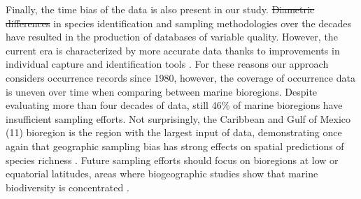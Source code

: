 \documentclass[12pt,authoryear]{elsarticle}
\providecommand{\DIFaddtex}[1]{{\protect\color{blue}\uwave{#1}}} %
\providecommand{\DIFdeltex}[1]{{\protect\color{red}\sout{#1}}}                      %
\providecommand{\DIFaddbegin}{} %
\providecommand{\DIFaddend}{} %
\providecommand{\DIFdelbegin}{} %
\providecommand{\DIFdelend}{} %
\providecommand{\DIFadd}[1]{\texorpdfstring{\DIFaddtex{#1}}{#1}} %
\providecommand{\DIFdel}[1]{\texorpdfstring{\DIFdeltex{#1}}{}} %
\begin{document}

Finally, the time bias of the data is also present in our study. \DIFdelbegin \DIFdel{Diametric differences }\DIFdelend \DIFaddbegin \DIFadd{Differences }\DIFaddend in species identification and sampling methodologies over the decades have resulted in the production of databases of variable quality. However, the current era is characterized by more accurate data thanks to improvements in individual capture and identification tools \citep{costello2015conser,jin2020bdcleaner}. For these reasons our approach considers occurrence records since 1980, however, the coverage of occurrence data is uneven over time when comparing between marine bioregions. Despite evaluating more than four decades of data, still 46\% of marine bioregions have insufficient sampling efforts. Not surprisingly, the Caribbean and Gulf of Mexico (11) bioregion is the region with the largest input of data, demonstrating once again that geographic sampling bias has strong effects on spatial predictions of species richness \citep{yang2013geographical}. Future sampling efforts should focus on bioregions at low or equatorial latitudes, areas where biogeographic studies show that marine biodiversity is concentrated \citep{costello2017marine}.
\end{document}
